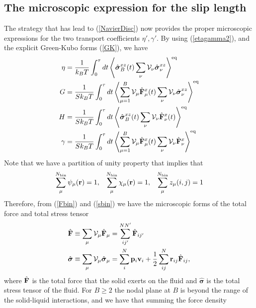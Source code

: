 \documentclass[b5paper,openright,10pt]{book}
\begin{document}
\subsection{The microscopic expression for the slip length}
The  strategy  that  has lead  to  (\ref{NavierDisc})  now
provides  the proper  microscopic  expressions for  the two  transport
coefficients   $\eta',\gamma'$.     By   using   (\ref{etagamma2}),
and the explicit Green-Kubo forms (\ref{GK}), we have
\begin{align}
\eta&= 
\frac{1}{k_BT}\int_0^{\tau} dt
\left\langle  \hat{\boldsymbol{\sigma}}^{xz}_{B}(t) \sum_{\nu} {\cal V}_\nu \hat{\boldsymbol{\sigma}}^{xz}_{\nu}\right\rangle^{\rm eq}
\nonumber\\
G &=   \frac{1}{Sk_BT}\int_0^{\tau} dt
\left\langle  \sum^{B}_{\mu=1}{\cal V}_\mu\hat{\bf F}^{x}_\mu(t) \sum_{\nu} {\cal V}_\nu\hat{\boldsymbol{\sigma}}^{xz}_\nu\right\rangle^{\rm eq}
\nonumber\\
H &=   \frac{1}{Sk_BT}\int_0^{\tau} dt
\left\langle  \hat{\boldsymbol{\sigma}}^{xz}_{B}(t) \sum_{\nu} {\cal V}_\nu 
\hat{\bf F}^{x}_\nu(t)\right\rangle^{\rm eq}
\nonumber\\
\gamma&= 
\frac{1}{Sk_BT}\int_0^{\tau} dt
\left\langle  \sum^{B}_{\mu=1}{\cal V}_\mu\hat{\bf F}^{x}_\mu(t)\sum_{\nu}{\cal V}_\nu \hat{\bf F}^{x}_\nu\right\rangle^{\rm eq}
\label{etagamma3}
\end{align}
Note that we have a partition of unity property that implies that
\begin{align}
  \sum_\mu^{N_{\rm bin}}\psi_\mu({\bf r})=1, &&
  \sum_\mu^{N_{\rm bin}}\chi_\mu({\bf r})=1, &&
  \sum_\mu^{N_{\rm bin}}z_\mu(i,j)=1
\end{align}
Therefore, from (\ref{Fbin}) and  (\ref{sbin}) we have the microscopic
forms of the total force and total stress tensor
\begin{align}
\hat{\bf F}&\equiv \sum_\mu{\cal V}_\mu\hat{\bf F}_\mu=\sum^{NN'}_{ij'}\hat{\bf F}_{ij'}  
\nonumber\\
\hat{\boldsymbol{\sigma}}&\equiv \sum_\mu{\cal V}_\mu \hat{\boldsymbol{\sigma}}_\mu=\sum^N_i{\bf p}_i{\bf v}_i
+\frac{1}{2}\sum^{N}_{ij}{\bf r}_{ij}\hat{\bf F}_{ij}, 
\label{TotalFsigma}
\end{align}
where $\hat{\bf  F}$ is the total  force that the solid  exerts on the
fluid  and $\hat{\boldsymbol{\sigma}}$  is the  total stress  tensor of  the
fluid.   For $B\ge  2$ the  nodal  plane at $B$ is  beyond the  range of  the
solid-liquid interactions, and we have  that summing the force density
\end{document}
